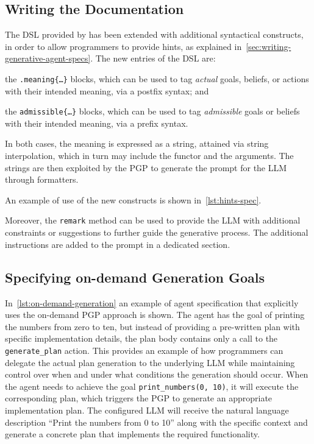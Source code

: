 \documentclass[12pt,a4paper,openright,twoside]{book}
\begin{document}
\subsection{Writing the Documentation}\label{sec:write-doc}

The \ac{DSL} provided by \jakta{} has been extended with additional syntactical constructs, in order to allow programmers to provide hints, as explained in~\cref{sec:writing-generative-agent-specs}.
%
The new entries of the \ac{DSL} are:
\begin{inlinelist}
    \item the \texttt{.meaning\{\ldots\}} blocks, which can be used to tag \emph{actual} goals, beliefs, or actions with their intended meaning, via a postfix syntax; and
    \item the \texttt{admissible\{\ldots\}} blocks, which can be used to tag \emph{admissible} goals or beliefs with their intended meaning, via a prefix syntax.
\end{inlinelist}
%
In both cases, the meaning is expressed as a string, attained via string interpolation, which in turn may include the functor and the arguments.
%
The strings are then exploited by the \ac{PGP} to generate the prompt for the \ac{LLM} through formatters.

An example of use of the new constructs is shown in~\cref{lst:hints-spec}.



Moreover, the \texttt{remark} method can be used to provide the LLM with additional constraints or suggestions to further guide the generative process.
%
The additional instructions are added to the prompt in a dedicated section.

\subsection{Specifying on-demand Generation Goals}\label{sec:on-demand-goals}

In~\cref{lst:on-demand-generation} an example of agent specification that explicitly uses the on-demand \ac{PGP} approach is shown. 
%
The agent has the goal of printing the numbers from zero to ten, but instead of providing a pre-written plan with specific implementation details, the plan body contains only a call to the \texttt{generate\_plan} action. 
%
This provides an example of how programmers can delegate the actual plan generation to the underlying \ac{LLM} while maintaining control over when and under what conditions the generation should occur.
%
When the agent needs to achieve the goal \texttt{print\_numbers(0, 10)}, it will execute the corresponding plan, which triggers the \ac{PGP} to generate an appropriate implementation plan. 
%
The configured \ac{LLM} will receive the natural language description ``Print the numbers from 0 to 10'' along with the specific context and generate a concrete plan that implements the required functionality. 
\end{document}
